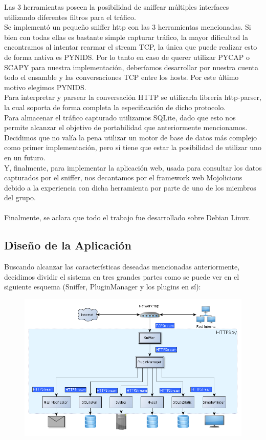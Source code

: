 Las 3 herramientas poseen la posibilidad de sniffear múltiples interfaces utilizando diferentes filtros para el tráfico. 
\\Se implementó un pequeño sniffer http con las 3 herramientas mencionadas. Si bien con todas ellas es bastante simple capturar tráfico, la mayor dificultad la encontramos al intentar rearmar el stream TCP, la única que puede realizar esto de forma nativa es PYNIDS. Por lo tanto en caso de querer utilizar PYCAP o SCAPY para nuestra implementación, deberíamos desarrollar por nuestra cuenta todo el ensamble y las conversaciones TCP entre los hosts. Por este último motivo elegimos PYNIDS.
\\Para interpretar y parsear la conversación HTTP se utilizarla librería http-parser, la cual soporta de forma completa la especificación de dicho protocolo.
\\Para almacenar el tráfico capturado utilizamos SQLite, dado que esto nos permite alcanzar el objetivo de portabilidad que anteriormente mencionamos. Decidimos que no valía la pena utilizar un motor de base de datos más complejo como primer implementación, pero si tiene que estar la posibilidad de utilizar uno en un futuro.
\\Y, finalmente, para implementar la aplicación web, usada para consultar los datos capturados por el sniffer, nos decantamos por el framework web Mojolicious debido a la experiencia con dicha herramienta por parte de uno de los miembros del grupo.
\\
\\\indent Finalmente, se aclara que todo el trabajo fue desarrollado sobre Debian Linux.

\subsection{Diseño de la Aplicación}

Buscando alcanzar las características deseadas mencionadas anteriormente, decidimos dividir el sistema en tres grandes partes como se puede ver en el siguiente esquema (Sniffer, PluginManager y los plugins en sí):

\begin{figure}[hbtp]
    \centering
	\includegraphics[width=\textwidth]{img/modelo.png}
\end{figure}

